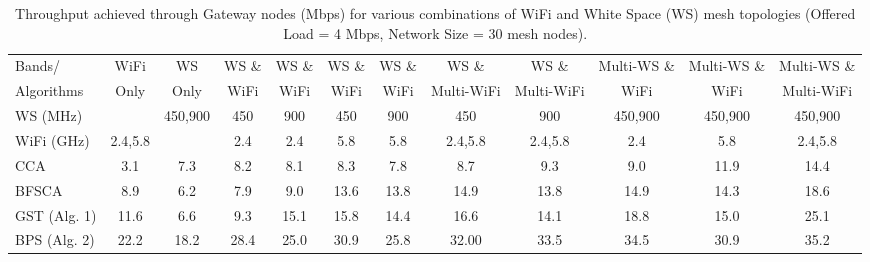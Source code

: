 

   \begin{table}[t] 
   \centering %
   \begin{tabular}{|l|c|c|c|c|c|c|c|c|c|c|c|} %
   \hline %
   Bands/     & WiFi    & WS      & WS \& & WS \& &  WS \& & WS \& & WS \&      &  WS \&      & Multi-WS \& & Multi-WS \& & Multi-WS \& \\%
   Algorithms & Only    & Only    & WiFi  & WiFi  &  WiFi  & WiFi  & Multi-WiFi &  Multi-WiFi & WiFi        & WiFi        & Multi-WiFi  \\
	   \hline %
	   WS (MHz)   &							    & 450,900 & 450 &  900  &  450   & 900		 & 450    & 900      & 450,900     & 450,900     & 450,900     \\
		   \hline
		   WiFi (GHz) & 2.4,5.8 &								  & 2.4 &  2.4  &  5.8   & 5.8		 & 2.4,5.8& 2.4,5.8	 & 2.4		   & 5.8         & 2.4,5.8     \\ %
		   \hline
		   \hline %
		   CCA~\cite{draves2004routing}			    & 3.1   &  7.3  & 8.2    &8.1    &8.3		 &7.8     &   8.7    &   9.3&     9.0             &         11.9     &   14.4          \\
			   \hline %
			   BFSCA~\cite{ramachandran2006interference}  & 8.9   &  6.2  & 7.9    & 9.0   & 13.6 	 & 13.8   &  14.9    &   13.8&      14.9           &      14.3       &       18.6      \\ 
			   \hline %
			   GST (Alg. 1)								& 11.6  &   6.6 & 9.3    &   15.1&   15.8	 &  14.4  &   16.6   &    14.1  &   18.8            &  15.0           &    25.1         \\
				   \hline %
				   BPS (Alg. 2)								& 22.2  & 18.2  &  28.4  & 25.0  & 30.9 	 & 25.8   &   32.00  &  33.5       &     34.5            &      30.9       &       35.2      \\ 
				   \hline %
				   \end{tabular} 
				   \label{tab:2channelcombination} 
				   \caption{Throughput achieved through Gateway nodes (Mbps) for various combinations of WiFi and White Space (WS) mesh topologies (Offered Load = 4 Mbps, Network Size = 30 mesh nodes).} %
				   \vspace{-0.1in}
				   \end{table} 

